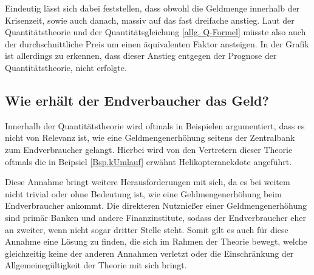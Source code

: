 Eindeutig lässt sich dabei feststellen, dass obwohl die Geldmenge innerhalb der Krisenzeit, sowie auch danach, massiv auf das fast dreifache anstieg. Laut der Quantitätstheorie und der Quantitätsgleichung \vref{allg. Q-Formel} müsste also auch der durchschnittliche Preis um einen äquivalenten Faktor ansteigen. In der Grafik ist allerdings zu erkennen, dass dieser Anstieg entgegen der Prognose der Quantitätstheorie, nicht erfolgte.

\subsection{Wie erhält der Endverbaucher das Geld?}

Innerhalb der Quantitätstheorie wird oftmals in Beispielen argumentiert, dass es nicht von Relevanz ist, wie eine Geldmengenerhöhung seitens der Zentralbank zum Endverbraucher gelangt. Hierbei wird von den Vertretern dieser Theorie oftmals die in Beipsiel \vref{Bsp.kUmlauf} erwähnt Helikopteranekdote angeführt.


Diese Annahme bringt weitere Herausforderungen mit sich, da es bei weitem nicht trivial oder ohne Bedeutung ist, wie eine Geldmengenerhöhung beim Endverbraucher ankommt. Die direkteren Nutznießer einer Geldmengenerhöhung sind primär Banken und andere Finanzinstitute, sodass der Endverbraucher eher an zweiter, wenn nicht sogar dritter Stelle steht. Somit gilt es auch für diese Annahme eine Lösung zu finden, die sich im Rahmen der Theorie bewegt, welche gleichzeitig keine der anderen Annahmen verletzt oder die Einschränkung der Allgemeinegültigkeit der Theorie mit sich bringt.